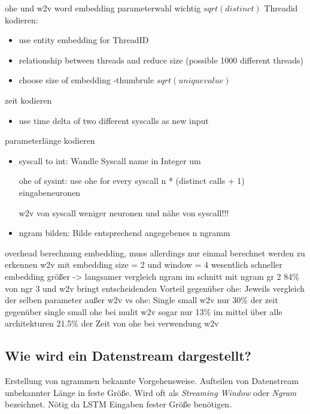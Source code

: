                 ohe und w2v
                word embedding parameterwahl wichtig $sqrt(distinct)$
                Threadid kodieren: 
                \begin{itemize}
                    \item use entity embedding for ThreadID~\cite{GUO2016} 
                    \item relationship between threads and reduce size (possible 1000 different threads)
                    \item choose size of embedding -thumbrule $sqrt(unique value)$
                \end{itemize}
                zeit kodieren
                \begin{itemize}
                    \item use time delta of two different syscalls as new input
                \end{itemize}
                parameterlänge kodieren
                \begin{itemize}
                    \item syscall to int: Wandle Syscall name in Integer um

                     ohe of sysint: use ohe for every syscall 
                     n * (distinct calls + 1) eingabeneuronen 

                     w2v von syscall
                     weniger neuronen und nähe von syscall!!!
                    \item ngram bilden: Bilde entsprechend angegebenes n ngramm
                \end{itemize}
                overhead berechnung embedding, muss allerdings nur einmal berechnet werden
                zu erkennen w2v mit embedding size = 2  und window = 4 wesentlich schneller
                embedding größer -> langsamer
                vergleich ngram
                im schnitt mit ngram gr 2 84\% von ngr 3 und 
                w2v bringt entscheidenden Vorteil gegenüber ohe:
                Jeweils vergleich der selben parameter außer w2v vs ohe:
                Single small w2v nur 30\% der zeit gegenüber single small ohe
                bei mulit w2v sogar nur 13\%
                im mittel über alle architekturen 21.5\% der Zeit von ohe bei verwendung w2v

        \subsection{Wie wird ein Datenstream dargestellt?}\label{sec:streamdarstellung}
            Erstellung von ngrammen bekannte Vorgehensweise.
            Aufteilen von Datenstream unbekannter Länge in feste Größe.
            Wird oft als \textit{Streaming Window} oder \textit{Ngram} bezeichnet.
            Nötig da LSTM Eingaben fester Größe benötigen.

